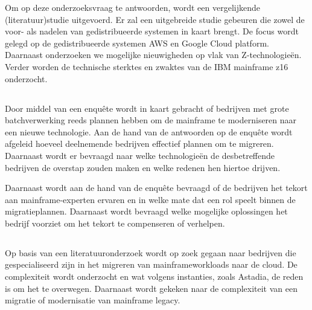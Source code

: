 Om op deze onderzoeksvraag te antwoorden, wordt een vergelijkende (literatuur)studie uitgevoerd. Er zal een uitgebreide studie gebeuren die zowel de voor- als nadelen van gedistribueerde systemen in kaart brengt. De focus wordt gelegd op de gedistribueerde systemen AWS en Google Cloud platform. Daarnaast onderzoeken we mogelijke nieuwigheden op vlak van Z-technologieën. Verder worden de technische sterktes en zwaktes van de IBM mainframe z16 onderzocht.

\subsection{}

Door middel van een enquête wordt in kaart gebracht of bedrijven met grote batchverwerking reeds plannen hebben om de mainframe te moderniseren naar een nieuwe technologie. Aan de hand van de antwoorden op de enquête wordt afgeleid hoeveel deelnemende bedrijven effectief plannen om te migreren. Daarnaast wordt er bevraagd naar welke technologieën de desbetreffende bedrijven de overstap zouden maken en welke redenen hen hiertoe drijven.

Daarnaast wordt aan de hand van de enquête bevraagd of de bedrijven het tekort aan mainframe-experten ervaren en in welke mate dat een rol speelt binnen de migratieplannen. Daarnaast wordt bevraagd welke mogelijke oplossingen het bedrijf voorziet om het tekort te compenseren of verhelpen.


\subsection{}

Op basis van een literatuuronderzoek wordt op zoek gegaan naar bedrijven die gespecialiseerd zijn in het migreren van mainframeworkloads naar de cloud. De complexiteit wordt onderzocht en wat volgens instanties, zoals Astadia, de reden is om het te overwegen. Daarnaast wordt gekeken naar de complexiteit van een migratie of modernisatie van mainframe legacy.
\newpage

